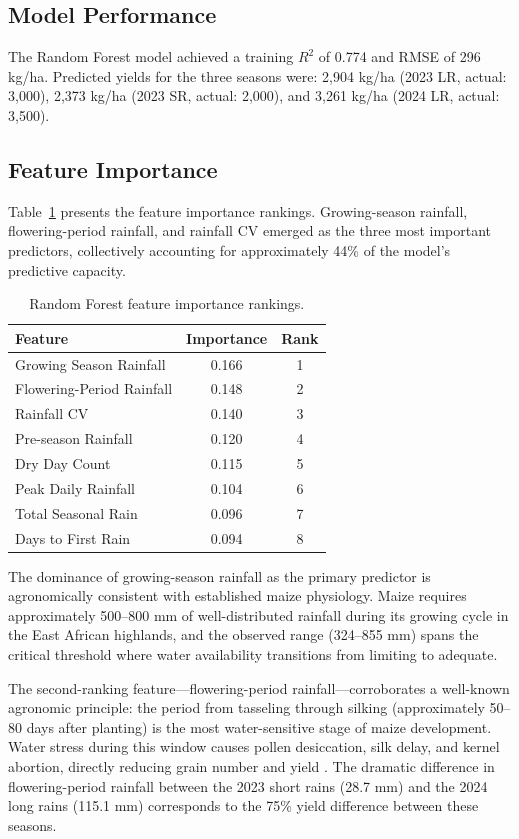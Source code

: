 \documentclass[11pt,a4paper]{article}
\begin{document}
\subsection{Model Performance}

The Random Forest model achieved a training $R^2$ of 0.774 and RMSE of 296 kg/ha. Predicted yields for the three seasons were: 2,904 kg/ha (2023 LR, actual: 3,000), 2,373 kg/ha (2023 SR, actual: 2,000), and 3,261 kg/ha (2024 LR, actual: 3,500).

\subsection{Feature Importance}

Table~\ref{tab:importance} presents the feature importance rankings. Growing-season rainfall, flowering-period rainfall, and rainfall CV emerged as the three most important predictors, collectively accounting for approximately 44\% of the model's predictive capacity.

\begin{table}[htbp]
\centering
\caption{Random Forest feature importance rankings.}
\label{tab:importance}
\begin{tabular}{lcc}
\toprule
\textbf{Feature} & \textbf{Importance} & \textbf{Rank} \\
\midrule
Growing Season Rainfall & 0.166 & 1 \\
Flowering-Period Rainfall & 0.148 & 2 \\
Rainfall CV & 0.140 & 3 \\
Pre-season Rainfall & 0.120 & 4 \\
Dry Day Count & 0.115 & 5 \\
Peak Daily Rainfall & 0.104 & 6 \\
Total Seasonal Rain & 0.096 & 7 \\
Days to First Rain & 0.094 & 8 \\
\bottomrule
\end{tabular}
\end{table}

The dominance of growing-season rainfall as the primary predictor is agronomically consistent with established maize physiology. Maize requires approximately 500--800 mm of well-distributed rainfall during its growing cycle in the East African highlands, and the observed range (324--855 mm) spans the critical threshold where water availability transitions from limiting to adequate.

The second-ranking feature---flowering-period rainfall---corroborates a well-known agronomic principle: the period from tasseling through silking (approximately 50--80 days after planting) is the most water-sensitive stage of maize development. Water stress during this window causes pollen desiccation, silk delay, and kernel abortion, directly reducing grain number and yield \cite{claassen2004}. The dramatic difference in flowering-period rainfall between the 2023 short rains (28.7 mm) and the 2024 long rains (115.1 mm) corresponds to the 75\% yield difference between these seasons.
\end{document}
